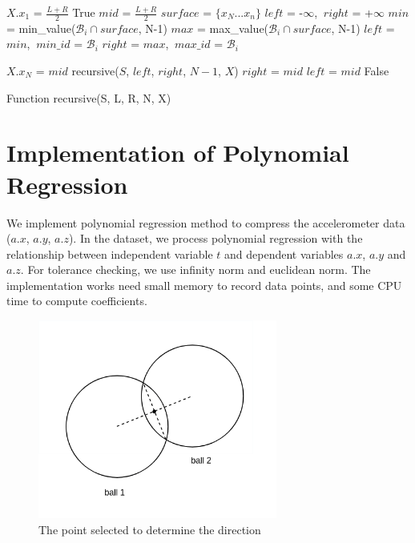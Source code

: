 \begin{algorithm}
\begin{algorithmic}[1]
\Input
\EndInput
\Output
\EndOutput
{}
    \State $X.x_1$ = $\frac{L+R}{2}$
    \State \Return True
\EndIf
{}
    \State $mid$ = $\frac{L+R}{2}$
    \State $surface$ = $\{x_{N}...x_{n}\}$
    \State $left$ = -$\infty$, $\ right$ = +$\infty$
        \State $min$ = min\_value($\mathcal{B}_i \cap surface$, N-1)
        \State $max$ = max\_value($\mathcal{B}_i \cap surface$, N-1)
            \State $left$ = $min$, $\ min\_id$ = $\mathcal{B}_i$
        \EndIf
            \State $right$ = $max$, $\ max\_id$ = $\mathcal{B}_i$
        \EndIf
    \EndFor
    
        \State $X.x_N$ = $mid$
        \State \Return recursive($S$, $left$, $right$, $N-1$, $X$)
        \State $right$ = $mid$
    \Else
        \State $left$ = $mid$
    \EndIf
\EndWhile
\State \Return False
\end{algorithmic}
\caption{Function recursive(S, L, R, N, X)}
\label{algo:recursive}
\end{algorithm}

\section{Implementation of Polynomial Regression}

We implement polynomial regression method to compress the accelerometer data
($a.x$, $a.y$, $a.z$). In the dataset, we process polynomial regression with the
relationship between independent variable $t$ and dependent variables $a.x$,
$a.y$ and $a.z$. For tolerance checking, we use infinity norm and euclidean
norm. The implementation works need small memory to record data points, and some
CPU time to compute coefficients.

\begin{figure}
  \centering
\includegraphics[width=0.7\textwidth]{figures/point-in-chord.png}
\caption{The point selected to determine the direction}
\label{fig:compare_point}
\end{figure}
